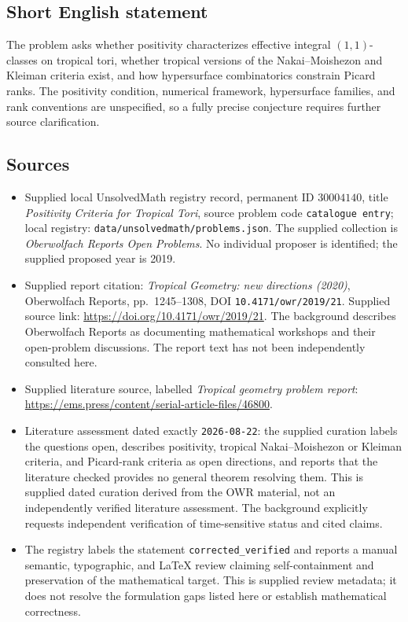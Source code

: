 \documentclass[11pt]{article}
\begin{document}
\subsection{Short English statement}
The problem asks whether positivity characterizes effective integral \((1,1)\)-classes on tropical tori, whether tropical versions of the Nakai--Moishezon and Kleiman criteria exist, and how hypersurface combinatorics constrain Picard ranks. The positivity condition, numerical framework, hypersurface families, and rank conventions are unspecified, so a fully precise conjecture requires further source clarification.
\subsection{Sources}
\begin{itemize}
\item Supplied local UnsolvedMath registry record, permanent ID \(30004140\), title \emph{Positivity Criteria for Tropical Tori}, source problem code \texttt{catalogue entry}; local registry: \texttt{data/unsolvedmath/problems.json}. The supplied collection is \emph{Oberwolfach Reports Open Problems}. No individual proposer is identified; the supplied proposed year is 2019.
\item Supplied report citation: \emph{Tropical Geometry: new directions (2020)}, Oberwolfach Reports, pp.\ 1245--1308, DOI \texttt{10.4171/owr/2019/21}. Supplied source link: \url{https://doi.org/10.4171/owr/2019/21}. The background describes Oberwolfach Reports as documenting mathematical workshops and their open-problem discussions. The report text has not been independently consulted here.
\item Supplied literature source, labelled \emph{Tropical geometry problem report}: \url{https://ems.press/content/serial-article-files/46800}.
\item Literature assessment dated exactly \texttt{2026-08-22}: the supplied curation labels the questions open, describes positivity, tropical Nakai--Moishezon or Kleiman criteria, and Picard-rank criteria as open directions, and reports that the literature checked provides no general theorem resolving them. This is supplied dated curation derived from the OWR material, not an independently verified literature assessment. The background explicitly requests independent verification of time-sensitive status and cited claims.
\item The registry labels the statement \texttt{corrected\_verified} and reports a manual semantic, typographic, and LaTeX review claiming self-containment and preservation of the mathematical target. This is supplied review metadata; it does not resolve the formulation gaps listed here or establish mathematical correctness.
\end{itemize}
\end{document}
